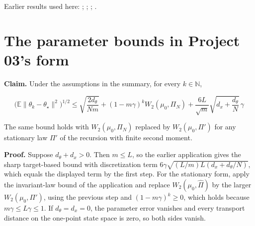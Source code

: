 \documentclass[11pt,a4paper]{article}
\begin{document}
Earlier results used here: \cite[Section~3.17.4]{LangevinLean2026ULASC}; \cite[Section~3.21.2]{LangevinLean2026ULASC}; \cite[Section~3.36.7]{LangevinLean2026ULASC}; \cite[Section~3.1.1]{LangevinLean2026IPLA}.

\section{\texorpdfstring{The parameter bounds in Project 03's form}{The parameter bounds in Project 03's form}}


\textbf{Claim.} Under the assumptions in the summary, for every \(k\in\mathbb N\),

\[\bigl(\mathbb E\|\theta_k-\theta_\star\|^2\bigr)^{1/2}\le\sqrt{\frac{2d_\theta}{Nm}}+(1-m\gamma)^kW_2(\mu_0,\Pi_N)+\frac{6L}{\sqrt m}\sqrt{d_x+\frac{d_\theta}N}\,\gamma\]

The same bound holds with \(W_2(\mu_0,\Pi_N)\) replaced by \(W_2(\mu_0,\Pi')\) for any stationary law \(\Pi'\) of the recursion with finite second moment.



\textbf{Proof.} Suppose \(d_\theta+d_x>0\). Then \(m\le L\), so the earlier application gives the sharp target-based bound with discretization term \(6\gamma\sqrt{(L/m)L(d_x+d_\theta/N)}\), which equals the displayed term by the first step. For the stationary form, apply the invariant-law bound of the application and replace \(W_2(\mu_0,\widehat\Pi)\) by the larger \(W_2(\mu_0,\Pi')\), using the previous step and \((1-m\gamma)^k\ge0\), which holds because \(m\gamma\le L\gamma\le1\). If \(d_\theta=d_x=0\), the parameter error vanishes and every transport distance on the one-point state space is zero, so both sides vanish.
\end{document}
